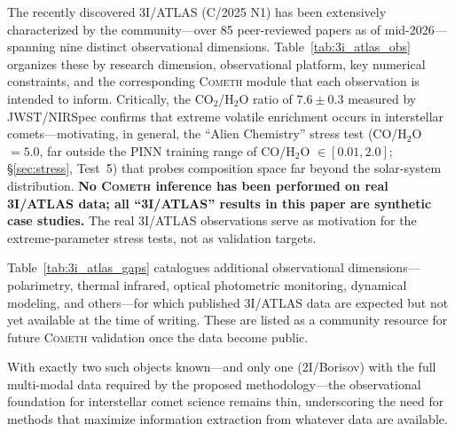 \documentclass[usenatbib]{mnras}
\begin{document}
The recently discovered 3I/ATLAS (C/2025 N1) has been extensively characterized by the community---over 85 peer-reviewed papers as of mid-2026---spanning nine distinct observational dimensions. Table~\ref{tab:3i_atlas_obs} organizes these by research dimension, observational platform, key numerical constraints, and the corresponding \textsc{Cometh} module that each observation is intended to inform. Critically, the CO$_2$/H$_2$O ratio of $7.6 \pm 0.3$ measured by JWST/NIRSpec \citep{cordiner25} confirms that extreme volatile enrichment occurs in interstellar comets---motivating, in general, the ``Alien Chemistry'' stress test (CO/H$_2$O~$=5.0$, far outside the PINN training range of CO/H$_2$O $\in [0.01, 2.0]$; \S\ref{sec:stress}, Test~5) that probes composition space far beyond the solar-system distribution. \textbf{No \textsc{Cometh} inference has been performed on real 3I/ATLAS data; all ``3I/ATLAS'' results in this paper are synthetic case studies.} The real 3I/ATLAS observations serve as motivation for the extreme-parameter stress tests, not as validation targets.

Table~\ref{tab:3i_atlas_gaps} catalogues additional observational dimensions---polarimetry, thermal infrared, optical photometric monitoring, dynamical modeling, and others---for which published 3I/ATLAS data are expected but not yet available at the time of writing. These are listed as a community resource for future \textsc{Cometh} validation once the data become public.

With exactly two such objects known---and only one (2I/Borisov) with the full multi-modal data required by the proposed methodology---the observational foundation for interstellar comet science remains thin, underscoring the need for methods that maximize information extraction from whatever data are available.
\end{document}
